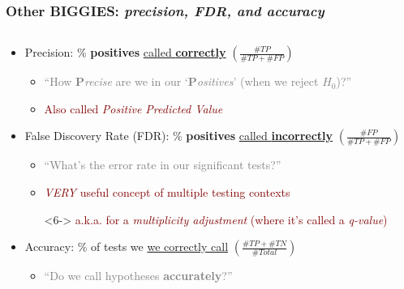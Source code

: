 \documentclass[xcolor={dvipsnames}]{beamer}
\begin{document}
\frame
{
\frametitle{Other BIGGIES: \emph{precision, FDR, and accuracy}}

\vspace{-2.5em}

\hspace*{-1em}\begin{columns}
\begin{column}{1.1\textwidth}

\small

\begin{itemize}
\item Precision:  \% \textbf{positives} \underline{called \textbf{correctly}} $\left(\frac{\#TP}{\#TP+\#FP}\right)$
\item[]
\begin{itemize}
\item<2->[] \textcolor{gray}{``How ${\boldsymbol P}$\emph{recise} are we in our `${\boldsymbol P}$\emph{ositives}' (when we reject $H_0$)?''}
\item[]
\item<3-> \textcolor{Maroon}{Also called \emph{Positive Predicted Value}}
\end{itemize}
\item[]
\item<4-> False Discovery Rate (FDR):  \% \textbf{positives} \underline{called \textbf{incorrectly}} $\left(\frac{\#FP}{\#TP+\#FP}\right)$
\item[]
\begin{itemize}
\item<5->[] \textcolor{gray}{``What's the error rate in our significant tests?''}
\item[]
\item<6-> \textcolor{Maroon}{\emph{VERY} useful concept of multiple testing contexts}
\item[]<6-> \textcolor{Maroon}{a.k.a. for a \emph{multiplicity adjustment} (where it's called a \emph{q-value})}
\end{itemize}
\item[]
\item<7-> Accuracy:  \% of tests we \underline{we correctly call} $\left(\frac{\#TP+\#TN}{\#Total}\right)$
\item[]
\begin{itemize}
\item<8->[] \textcolor{gray}{``Do we call hypotheses \textbf{accurately}?''}
\end{itemize}
\end{itemize}

\end{column}
\end{columns}

}
\end{document}

